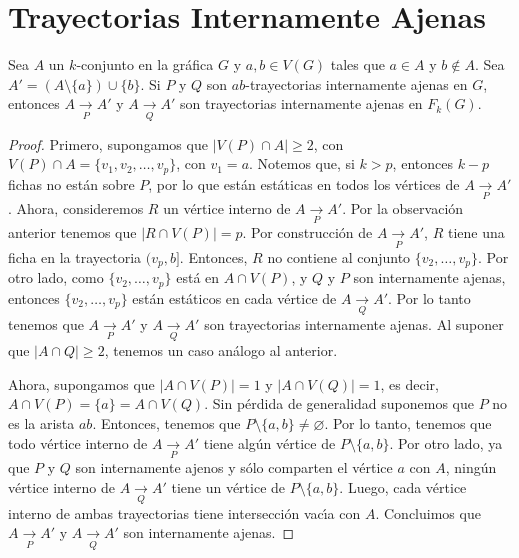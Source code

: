 
\section{Trayectorias Internamente Ajenas}%
\label{sec:TrayIntAj}

\begin{lema}%
\label{lem:TrayIntAj-G-FG}
Sea $A$ un $k$-conjunto en la gr\'afica $G$ y $a, b \in V(G)$ tales que $a \in
A$ y $b \notin A$. Sea $A' = (A \setminus \{ a \}) \cup \{ b \}$. Si $P$ y $Q$
son $ab$-trayectorias internamente ajenas en $G$, entonces $A \xrightarrow[P]{}
A'$ y $A \xrightarrow[Q]{} A'$ son trayectorias internamente ajenas en
$F_{k}(G)$.
\end{lema}

\begin{proof}
    Primero, supongamos que $|V(P) \cap A| \geq 2$, con $V(P) \cap A = \{v_{1},
    v_{2}, \dots, v_{p}\}$, con $v_{1} = a$. Notemos que, si $k > p$, entonces
    $k-p$ fichas no est\'an sobre $P$, por lo que est\'an est\'aticas en todos
    los v\'ertices de $A \xrightarrow[P]{} A'$. Ahora, consideremos $R$ un
    v\'ertice interno de $A \xrightarrow[P]{} A'$. Por la observaci\'on anterior
    tenemos que  $|R \cap V(P)| = p$. Por construcci\'on de $A \xrightarrow[P]{}
    A'$, $R$ tiene una ficha en la trayectoria $(v_{p},b ]$. Entonces, $R$ no
    contiene al conjunto $\{v_{2}, \dots, v_{p}\}$. Por otro lado, como
    $\{v_{2}, \dots, v_{p}\}$ est\'a en $A \cap V(P)$, y $Q$ y $P$ son
    internamente ajenas, entonces $\{v_{2}, \dots, v_{p}\}$ est\'an est\'aticos
    en cada v\'ertice de $A \xrightarrow[Q]{} A'$. Por lo tanto tenemos que $A
    \xrightarrow[P]{} A'$ y $A \xrightarrow[Q]{}A'$ son trayectorias
    internamente ajenas. Al suponer que $|A \cap Q| \geq 2$, tenemos un caso
    an\'alogo al anterior.

    Ahora, supongamos que $|A \cap V(P)| = 1$ y $|A \cap V(Q)| = 1$, es decir,
    $A \cap V(P) = \{a\} = A \cap V(Q)$. Sin p\'erdida de generalidad suponemos
    que $P$ no es la arista $ab$. Entonces, tenemos que $P \setminus \{a,b\}
    \neq \varnothing$. Por lo tanto, tenemos que todo v\'ertice interno de $A
    \xrightarrow[P]{} A'$ tiene alg\'un v\'ertice de $P \setminus \{a, b\}$. Por
    otro lado, ya que $P$ y $Q$ son internamente ajenos y s\'olo comparten el
    v\'ertice $a$ con $A$, ning\'un v\'ertice interno de $A \xrightarrow[Q]{}
    A'$ tiene un v\'ertice de $P \setminus \{a, b\}$. Luego, cada v\'ertice
    interno de ambas trayectorias tiene intersecci\'on vac\'\i{}a con $A$.
    Concluimos que $A \xrightarrow[P]{} A'$ y $A \xrightarrow[Q]{} A'$ son
    internamente ajenas.
\end{proof}

